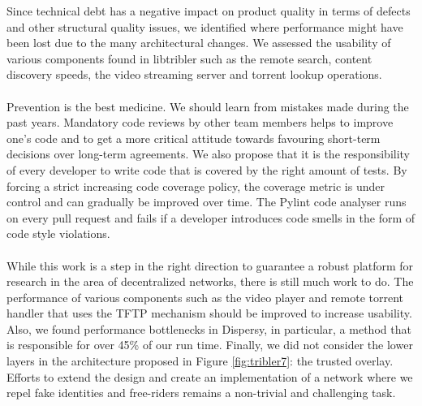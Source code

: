 Since technical debt has a negative impact on product quality in terms of defects and other structural quality issues, we identified where performance might have been lost due to the many architectural changes. We assessed the usability of various components found in libtribler such as the remote search, content discovery speeds, the video streaming server and torrent lookup operations.\\\\
Prevention is the best medicine. We should learn from mistakes made during the past years. Mandatory code reviews by other team members helps to improve one's code and to get a more critical attitude towards favouring short-term decisions over long-term agreements. We also propose that it is the responsibility of every developer to write code that is covered by the right amount of tests. By forcing a strict increasing code coverage policy, the coverage metric is under control and can gradually be improved over time. The Pylint code analyser runs on every pull request and fails if a developer introduces code smells in the form of code style violations.\\\\
While this work is a step in the right direction to guarantee a robust platform for research in the area of decentralized networks, there is still much work to do. The performance of various components such as the video player and remote torrent handler that uses the TFTP mechanism should be improved to increase usability. Also, we found performance bottlenecks in Dispersy, in particular, a method that is responsible for over 45\% of our run time. Finally, we did not consider the lower layers in the architecture proposed in Figure \ref{fig:tribler7}: the trusted overlay. Efforts to extend the design and create an implementation of a network where we repel fake identities and free-riders remains a non-trivial and challenging task.

